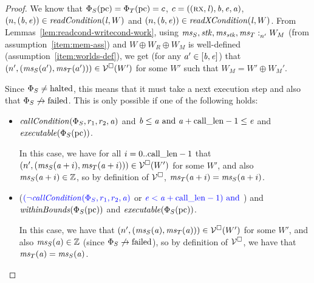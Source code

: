 \documentclass[a4paper]{article}
\begin{document}
\begin{proof}
We know that $\Phi_S(\pcreg) = \Phi_T(\pcreg) = c$, $c=((\rx,\lin),\baddr,\eaddr,\aaddr)$, $\npair{(\baddr,\eaddr)}\in \readCond{\lin,W}$ and $\npair{(\baddr,\eaddr)}\in \xReadCond{\lin,W}$.
From Lemmas~\ref{lem:readcond-writecond-work}, using $\memSat[n']{\ms_S,\stk,\ms_\stk,\ms_T}{W_M}$ (from assumption~\ref{item:mem-ass}) and $W \oplus W_R \oplus W_M$ is well-defined (assumption~\ref{item:worlds-def}), we get (for any $a' \in [\baddr,\eaddr]$) that $\npair[n']{(\ms_S(a'),\ms_T(a'))} \in \lrv(W')$ for some $W'$ such that $W_M = W' \oplus W_M'$.

Since $\Phi_S \neq \halted$, this means that it must take a next execution step and also that $\Phi_S \not\step\failed$. 
This is only possible if one of the following holds:
\begin{itemize}
\item $\callCond{\Phi_S,r_1,r_2,\aaddr}$ and
  $\baddr \leq \aaddr \tand \aaddr + \calllen-1 \leq \eaddr$ and 
  $\exec{\Phi_S(\pcreg)}$.

  In this case, we have for all $i = 0..\calllen-1$ that $\npair[n']{(\ms_S(\aaddr+i),\ms_T(\aaddr+i))} \in \lrv(W')$ for some $W'$, and also $\ms_S(\aaddr+i) \in \ints$, so by definition of $\lrv$, $\ms_T(\aaddr+i) = \ms_S(\aaddr+i)$.
\item ($\src{(\neg\callCond{\Phi_S,r_1,r_2,\aaddr}}$ or $\src{\eaddr < \aaddr + \calllen-1) \tand}$) and
  $\withinBounds{\Phi_S(\pcreg)}$ and $\exec{\Phi_S(\pcreg)}$.

  In this case, we have that $\npair[n']{(\ms_S(\aaddr),\ms_T(\aaddr))} \in \lrv(W')$ for some $W'$, and also $\ms_S(\aaddr) \in \ints$ (since $\Phi_S \not\step\failed$), so by definition of $\lrv$, we have that $\ms_T(\aaddr) = \ms_S(\aaddr)$.
\end{itemize}


\end{proof}
\end{document}

